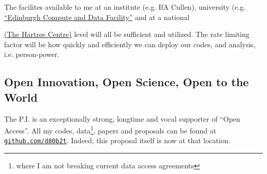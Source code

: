 \documentclass[oneside, a4paper, onecolumn, 11pt]{article}
\begin{document}
\smallskip
\smallskip
\noindent
The facilites available to me at an institute (e.g. IfA Cullen),
university
(e.g. \href{https://www.ed.ac.uk/information-services/research-support/research-computing/ecdf}{``Edinburgh
Compute and Data Facility''} and at a national
{\href{https://www.hartree.stfc.ac.uk/Pages/home.aspx}{(The Hartree
Centre)} level will all be sufficient and utilized.  The rate limiting
factor will be how quickly and efficiently we can deploy our codes,
and analysis, i.e. person-power.

\subsection*{Open Innovation, Open Science, Open to the World}
The P.I. is an exceptionally strong, longtime and vocal supporter of ``Open Access''. 
All my codes, data\footnote{where I am not breaking current data access agreements}, papers 
and proposals can be found at \href{github.com/d80b2t}{{\tt github.com/d80b2t}}. 
Indeed, this proposal itself is now at that location. 

}
\end{document}
